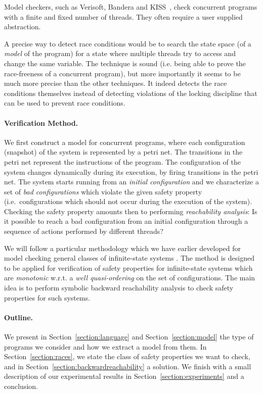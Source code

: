 Model checkers, such as Verisoft, Bandera and
KISS~\cite{HJM04:ContextInference, D03:Verisoft, QW04:Kiss,
  CDHR00:Bandera}, check concurrent programs with a finite and fixed
number of threads. They often require a user supplied abstraction.

A precise way to detect race conditions would be to search the state
space (of a \emph{model} of the program) for a state where multiple
threads try to access and change the same variable.  The technique is
sound (i.e. being able to prove the race-freeness of a concurrent
program), but more importantly it seems to be much more precise than
the other techniques. It indeed detects the race conditions themselves
instead of detecting violations of the locking discipline that can be
used to prevent race conditions.

\paragraph{\bf Verification Method.}
We first construct a model for concurrent programs, where each
configuration (snapshot) of the system is represented by a petri
net. The transitions in the petri net represent the instructions of
the program. The configuration of the system changes dynamically
during its execution, by firing transitions in the petri net. The
system starts running from an \emph{initial configuration} and we
characterize a set of \emph{bad configurations} which violate the
given safety property (i.e.\ configurations which should not occur
during the execution of the system).
%
%
Checking the safety property amounts then to performing
\emph{reachability analysis}: Is it possible to reach a bad
configuration from an initial configuration through a sequence of
actions performed by different threads?

We will follow a particular methodology which we have earlier developed
for model checking general classes of infinite-state systems
 \cite{Parosh:Bengt:Karlis:Tsay:general}.
%
The method is designed to be applied for verification of
safety properties for infinite-state systems 
which are \emph{monotonic} w.r.t. a \emph{well quasi-ordering} on the set
of configurations.
%
The main idea is to perform symbolic backward reachability analysis
to check safety properties for such systems.
%

\paragraph{\bf Outline.}
We present in Section~\ref{section:language} and
Section~\ref{section:model} the type of programs we consider and how
we extract a model from them. In Section~\ref{section:races}, we state
the class of safety properties we want to check, and in
Section~\ref{section:backwardreachability} a solution. We finish with
a small description of our experimental results in
Section~\ref{section:experiments} and a conclusion.
